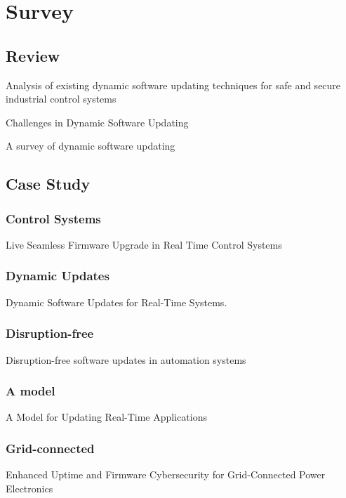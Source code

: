 \chapter{Survey}

\section{Review}
Analysis of existing dynamic software updating techniques for safe and secure industrial control systems

Challenges in Dynamic Software Updating

A survey of dynamic software updating

\section{Case Study}

\subsection{Control Systems}
Live Seamless Firmware Upgrade in Real Time Control Systems 

\subsection{Dynamic Updates}
Dynamic Software Updates for Real-Time Systems.

\subsection{Disruption-free}
Disruption-free software updates in automation systems

\subsection{A model}
A Model for Updating Real-Time Applications

\subsection{Grid-connected}
Enhanced Uptime and Firmware Cybersecurity for Grid-Connected Power Electronics